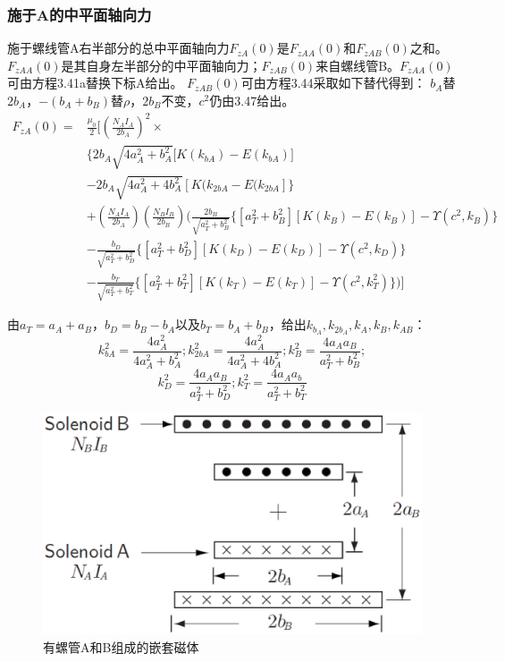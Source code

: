 \subsubsection{施于A的中平面轴向力}
施于螺线管A右半部分的总中平面轴向力$F_{zA}(0)$是$F_{zAA}(0)$和$F_{zAB}(0)$之和。$F_{zAA}(0)$是其自身左半部分的中平面轴向力；$F_{zAB}(0)$来自螺线管B。$F_{zAA}(0)$可由方程3.41a替换下标A给出。 $F_{zAB}(0)$可由方程3.44采取如下替代得到： $b_A$替$2b_A$，$−(b_A+b_B)$替$\rho$，$2b_B$不变，$c^2$仍由3.47给出。
\begin{equation}
\begin{split}
F_{zA}(0)=&\frac{\mu_0}{2}[(\frac{N_A I_A}{2b_A})^2\times \\
&\{{2b_A\sqrt{4a_A^2+b_A^2}[K(k_{bA})-E(k_{bA})}]\\
&-2b_A\sqrt{4a_A^2+4b_A^2}[K(k_{2bA}-E(k_{2bA}]\}\\
&+(\frac{N_AI_A}{2b_A})(\frac{N_BI_B}{2b_B})(\frac{2b_B}{\sqrt{a_T^2+b_B^2}}\{[a_T^2+b_B^2][K(k_B)-E(k_{B})]-\Upsilon(c^2,k_B)\}\\
&-\frac{b_D}{\sqrt{a_T^2+b_D^2}}\{{[a_T^2+b_D^2][K(k_D)-E(k_D)]-\Upsilon(c^2,k_D)}\}\\
&-\frac{b_T}{\sqrt{a_T^2+b_T^2}}\{[a_T^2+b_T^2][K(k_T)-E(k_T)]-\Upsilon(c^2,k_T^2)\})]
\end{split}
\end{equation}

由$a_T=a_A+a_B$，$b_D=b_B-b_A$以及$b_T=b_A+b_B$，给出$k_{b_A}, k_{2b_A}, k_A,k_B, k_{AB}$：
$$ k_{bA}^2=\frac{4a_A^2}{4a_A^2+b_A^2}; k_{2bA}^2=\frac{4a_A^2}{4a_A^2+4b_A^2}; k_B^2=\frac{4a_Aa_B}{a_T^2+b_B^2};$$
$$k_D^2=\frac{4a_Aa_B}{a_T^2+b_D^2}; k_T^2=\frac{4a_Aa_b}{a_T^2+b_T^2}$$

\begin{figure}[htbp]
  \centering
 \includegraphics[scale=0.4]{chpt3/figs/fig3.9.eps}
  \caption{有螺管A和B组成的嵌套磁体}
\end{figure}

